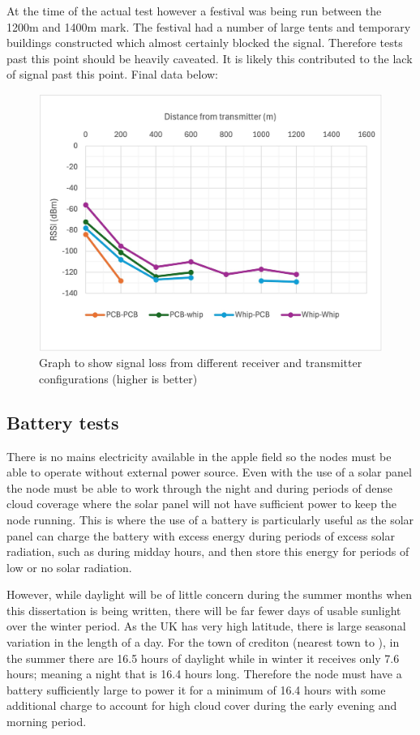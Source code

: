 At the time of the actual test however a festival was being run between the
1200m and 1400m mark. The festival had a number of large tents and temporary
buildings constructed which almost certainly blocked the signal. Therefore tests
past this point should be heavily caveated. It is likely this contributed to the
lack of signal past this point. Final data below:

\begin{figure}[H]
    \centering
    \includegraphics[width=1\textwidth]{contents/part-2/fig2/distance-graph.jpg}
    \caption{Graph to show signal loss from different receiver and transmitter configurations (higher is better)}
    \label{fig:range-test-elevation}
\end{figure}

\subsection{Battery tests}

There is no mains electricity available in the apple field so the nodes must be
able to operate without external power source. Even with the use of a solar
panel the node must be able to work through the night and during periods of
dense cloud coverage where the solar panel will not have sufficient power to
keep the node running. This is where the use of a battery is particularly useful
as the solar panel can charge the battery with excess energy during periods of
excess solar radiation, such as during midday hours, and then store this energy
for periods of low or no solar radiation.

However, while daylight will be of little concern during the summer months when
this dissertation is being written, there will be far fewer days of usable
sunlight over the winter period. As the UK has very high latitude, there is
large seasonal variation in the length of a day. For the town of crediton
(nearest town to \farmName), in the summer there are 16.5 hours of daylight
while in winter it receives only 7.6 hours; meaning a night that is 16.4 hours
long. Therefore the node must have a battery sufficiently large to power it for
a minimum of 16.4 hours with some additional charge to account for high cloud
cover during the early evening and morning period.

